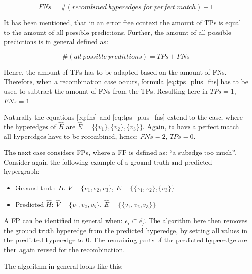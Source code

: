 \begin{equation}
    FNs = \#(recombined\ hyperedges\ for\ perfect\ match) - 1
    \label{eq:fns}
\end{equation}

It has been mentioned, that in an error free context the amount of \acp{TP} is equal to the amount of all possible predictions.
Further, the amount of all possible predictions is in general defined as:

\begin{equation}
    \#(all\ possible\ predictions) = TPs + FNs
    \label{eq:tps_plus_fns}
\end{equation}

Hence, the amount of \acp{TP} has to be adapted based on the amount of \acp{FN}.
Therefore, when a recombination case occurs, formula \ref{eq:tps_plus_fns} has to be used to subtract the amount of \acp{FN} from the \acp{TP}.
Resulting here in $TPs = 1$, $FNs = 1$.

Naturally the equations \ref{eq:fns} and \ref{eq:tps_plus_fns} extend to the case, where the hyperedges of $\hat{H}$ are $\hat{E} = \{\{v_1\}, \{v_2\}, \{v_3\}\}$.
Again, to have a perfect match all hyperedges have to be recombined, hence: $FNs = 2$, $TPs = 0$.

The next case considers \acp{FP}, where a \ac{FP} is defined as: ``a subedge too much''.
Consider again the following example of a ground truth and predicted hypergraph:

\begin{itemize}
    \item Ground truth $H$: $V = \{v_1, v_2, v_3\}$, $E = \{\{v_1, v_2\}, \{v_3\}\}$
    \item Predicted $\hat{H}$: $\hat{V} = \{v_1, v_2, v_3\}$, $\hat{E} = \{\{v_1, v_2, v_3\}\}$
\end{itemize}

A \ac{FP} can be identified in general when: $e_i \subset \hat{e_j}$.
The algorithm here then removes the ground truth hyperedge from the predicted hyperedge, by setting all values in the predicted hyperedge to 0.
The remaining parts of the predicted hyperedge are then again reused for the recombination.

The algorithm in general looks like this:

